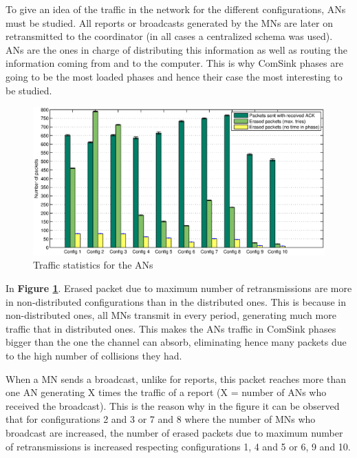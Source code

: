 To give an idea of the traffic in the network for the different configurations, \acp{AN} must be studied. All reports or broadcasts generated by the
\acp{MN} are later on retransmitted to the coordinator (in all cases a centralized schema was used). \acp{AN} are the ones in charge of distributing this
information as well as routing the information coming from and to the computer. This is why ComSink phases are going to be the most loaded
phases and hence their case the most interesting to be studied.

\begin{figure}[ht]
 \begin{center}
  \includegraphics[width=1\textwidth]{packetsSentErasedNoTimeAN.eps}
 \end{center}
 \caption{Traffic statistics for the \acp{AN}}
 \label{fig:packetsSentErasedNoTimeAN}
\end{figure}

In \textbf{Figure \ref{fig:packetsSentErasedNoTimeAN}}. Erased packet due to maximum number of retransmissions are more in non-distributed 
configurations than in the distributed ones. This is because in non-distributed ones, all \acp{MN} transmit in every period, generating much more traffic
that in distributed ones. This makes the \acp{AN} traffic in ComSink phases bigger than the one the channel can absorb, eliminating hence many packets 
due to the high number of collisions they had.

When a \ac{MN} sends a broadcast, unlike for reports, this packet reaches more than one \ac{AN} generating X times the traffic of a report (X = number of \acp{AN}
who received the broadcast). This is the reason why in the figure it can be observed that for configurations 2 and 3 or 7 and 8 where the number of 
\acp{MN} who broadcast are increased, the number of erased packets due to maximum number of retransmissions is increased respecting configurations
1, 4 and 5 or 6, 9 and 10.

